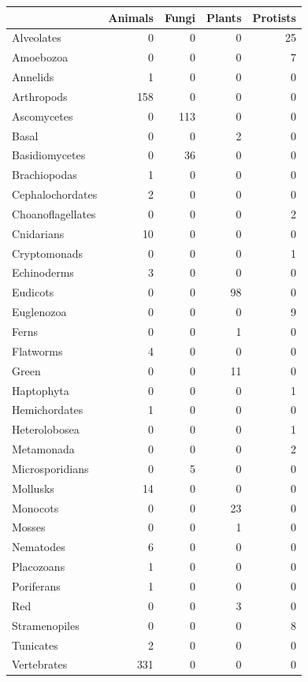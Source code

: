\documentclass[
  letterpaper,
  DIV=11,
  numbers=noendperiod]{scrreprt}
\begin{document}
\begin{tabular}{l|r|r|r|r}
\hline
  & Animals & Fungi & Plants & Protists\\
\hline
Alveolates & 0 & 0 & 0 & 25\\
\hline
Amoebozoa & 0 & 0 & 0 & 7\\
\hline
Annelids & 1 & 0 & 0 & 0\\
\hline
Arthropods & 158 & 0 & 0 & 0\\
\hline
Ascomycetes & 0 & 113 & 0 & 0\\
\hline
Basal & 0 & 0 & 2 & 0\\
\hline
Basidiomycetes & 0 & 36 & 0 & 0\\
\hline
Brachiopodas & 1 & 0 & 0 & 0\\
\hline
Cephalochordates & 2 & 0 & 0 & 0\\
\hline
Choanoflagellates & 0 & 0 & 0 & 2\\
\hline
Cnidarians & 10 & 0 & 0 & 0\\
\hline
Cryptomonads & 0 & 0 & 0 & 1\\
\hline
Echinoderms & 3 & 0 & 0 & 0\\
\hline
Eudicots & 0 & 0 & 98 & 0\\
\hline
Euglenozoa & 0 & 0 & 0 & 9\\
\hline
Ferns & 0 & 0 & 1 & 0\\
\hline
Flatworms & 4 & 0 & 0 & 0\\
\hline
Green & 0 & 0 & 11 & 0\\
\hline
Haptophyta & 0 & 0 & 0 & 1\\
\hline
Hemichordates & 1 & 0 & 0 & 0\\
\hline
Heterolobosea & 0 & 0 & 0 & 1\\
\hline
Metamonada & 0 & 0 & 0 & 2\\
\hline
Microsporidians & 0 & 5 & 0 & 0\\
\hline
Mollusks & 14 & 0 & 0 & 0\\
\hline
Monocots & 0 & 0 & 23 & 0\\
\hline
Mosses & 0 & 0 & 1 & 0\\
\hline
Nematodes & 6 & 0 & 0 & 0\\
\hline
Placozoans & 1 & 0 & 0 & 0\\
\hline
Poriferans & 1 & 0 & 0 & 0\\
\hline
Red & 0 & 0 & 3 & 0\\
\hline
Stramenopiles & 0 & 0 & 0 & 8\\
\hline
Tunicates & 2 & 0 & 0 & 0\\
\hline
Vertebrates & 331 & 0 & 0 & 0\\
\hline
\end{tabular}
\end{document}
